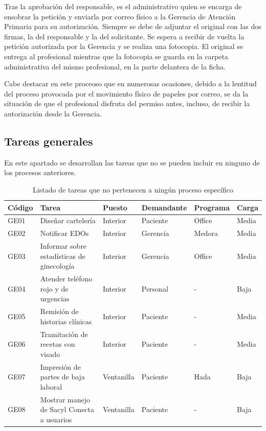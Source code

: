 Tras la aprobación del responsable, es el administrativo quien se encarga de ensobrar la petición y enviarla por correo físico a la Gerencia de Atención Primaria para su autorización.
Siempre se debe de adjuntar el original con las dos firmas, la del responsable y la del solicitante.
Se espera a recibir de vuelta la petición autorizada por la Gerencia y se realiza una fotocopia.
El original se entrega al profesional mientras que la fotocopia se guarda en la carpeta administrativa del mismo profesional, en la parte delantera de la ficha.

Cabe destacar en este proceoso que en numerosas ocasiones, debido a la lentitud del proceso provocada por el movimiento físico de papeles por correo, se da la situación de que el profesional disfruta del permiso antes, incluso, de recibir la autorización desde la Gerencia.

\subsection{Tareas generales}

En este apartado se desarrollan las tareas que no se pueden incluir en ninguno de los procesos anteriores.

\begin{table}[H]
    \begin{tabular}{lp{5cm}llll}
        \toprule
        Código & Tarea                                      & Puesto     & Demandante & Programa & Carga \\
        \midrule
        GE01   & Diseñar cartelería                         & Interior   & Paciente   & Office   & Media \\
        GE02   & Notificar EDOs                             & Interior   & Gerencia   & Medora   & Media \\
        GE03   & Informar sobre estadísticas de ginecología & Interior   & Gerencia   & Office   & Media \\
        GE04   & Atender teléfono rojo y de urgencias       & Interior   & Personal   & -        & Baja  \\
        GE05   & Remisión de historias clínicas             & Interior   & Paciente   & -        & Media \\
        GE06   & Tramitación de recetas con visado          & Interior   & Paciente   & -        & Media \\
        GE07   & Impresión de partes de baja laboral        & Ventanilla & Paciente   & Hada     & Baja  \\
        GE08   & Mostrar manejo de Sacyl Conecta a usuarios & Ventanilla & Paciente   & -        & Baja  \\
        \bottomrule
    \end{tabular}
    \caption{Listado de tareas que no pertenecen a ningún proceso específico}
    \label{tab:proceso-general}
\end{table}


